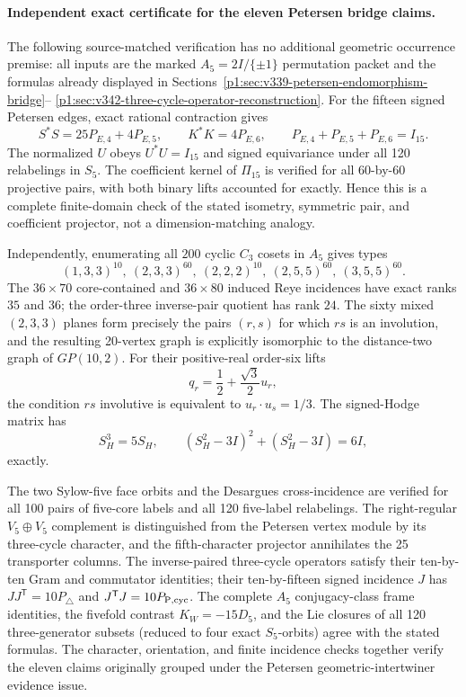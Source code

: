 \documentclass[11pt]{article}
\begin{document}
\paragraph{Independent exact certificate for the eleven Petersen bridge claims.}
The following source-matched verification has no additional geometric
occurrence premise: all inputs are the marked \(A_5=2I/\{\pm1\}\)
permutation packet and the formulas already displayed in
Sections~\ref{p1:sec:v339-petersen-endomorphism-bridge}--
\ref{p1:sec:v342-three-cycle-operator-reconstruction}.
For the fifteen signed Petersen edges, exact rational contraction gives
\[
 S^*S=25P_{E,4}+4P_{E,5},\qquad K^*K=4P_{E,6},\qquad
 P_{E,4}+P_{E,5}+P_{E,6}=I_{15}.
\]
The normalized \(U\) obeys \(U^*U=I_{15}\) and signed equivariance
under all 120 relabelings in \(S_5\).  The coefficient kernel of
\(\Pi_{15}\) is verified for all 60-by-60 projective pairs,
with both binary lifts accounted for exactly.  Hence this is a
complete finite-domain check of the stated isometry, symmetric pair,
and coefficient projector, not a dimension-matching analogy.

Independently, enumerating all \(200\) cyclic \(C_3\) cosets in
\(A_5\) gives types
\[
 (1,3,3)^{10},\ (2,3,3)^{60},\ (2,2,2)^{10},\
 (2,5,5)^{60},\ (3,5,5)^{60}.
\]
The \(36\times70\) core-contained and \(36\times80\) induced Reye
incidences have exact ranks \(35\) and \(36\); the order-three
inverse-pair quotient has rank \(24\).  The sixty mixed
\((2,3,3)\) planes form precisely the pairs \((r,s)\) for which
\(rs\) is an involution, and the resulting 20-vertex graph is
explicitly isomorphic to the distance-two graph of \(GP(10,2)\).
For their positive-real order-six lifts
\[
 q_r=\frac12+\frac{\sqrt3}{2}u_r,
\]
the condition \(rs\) involutive is equivalent to
\(u_r\cdot u_s=1/3\).  The signed-Hodge matrix has
\[
 S_H^3=5S_H,\qquad (S_H^2-3I)^2+(S_H^2-3I)=6I,
\]
exactly.

The two Sylow-five face orbits and the Desargues cross-incidence
are verified for all 100 pairs of five-core labels and all 120
five-label relabelings.  The right-regular
\(V_5\oplus V_5\) complement is distinguished from the Petersen
vertex module by its three-cycle character, and the fifth-character
projector annihilates the 25 transporter columns.  The inverse-paired
three-cycle operators satisfy their ten-by-ten Gram and commutator
identities; their ten-by-fifteen signed incidence \(J\) has
\(JJ^{\mathsf T}=10P_{\triangle}\) and
\(J^{\mathsf T}J=10P_{{\rm P},\mathrm{cyc}}\).
The complete \(A_5\) conjugacy-class frame identities, the fivefold
contrast \(K_W=-15D_5\), and the Lie closures of all 120
three-generator subsets (reduced to four exact \(S_5\)-orbits) agree
with the stated formulas.  The character, orientation, and finite
incidence checks together verify the eleven claims originally grouped
under the Petersen geometric-intertwiner evidence issue.
\end{document}
